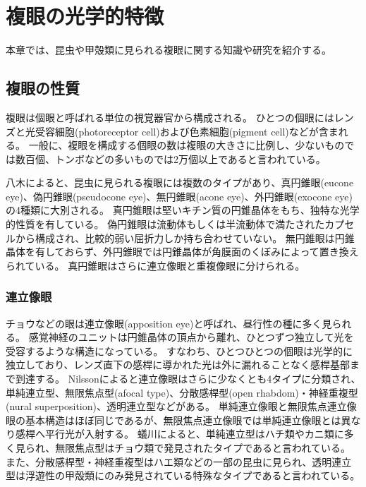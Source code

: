 \chapter{複眼の光学的特徴}
\label{CKnowledge}

本章では、昆虫や甲殻類に見られる複眼に関する知識や研究を紹介する。

\section{複眼の性質}

複眼は個眼と呼ばれる単位の視覚器官から構成される。
ひとつの個眼にはレンズと光受容細胞(photoreceptor cell)および色素細胞(pigment cell)などが含まれる。
一般に、複眼を構成する個眼の数は複眼の大きさに比例し、少ないものでは数百個、トンボなどの多いものでは2万個以上であると言われている。

八木\cite{}によると、昆虫に見られる複眼には複数のタイプがあり、真円錐眼(eucone eye)、偽円錐眼(pseudocone eye)、無円錐眼(acone eye)、外円錐眼(exocone eye)の4種類に大別される。
真円錐眼は堅いキチン質の円錐晶体をもち、独特な光学的性質を有している。
偽円錐眼は流動体もしくは半流動体で満たされたカプセルから構成され、比較的弱い屈折力しか持ち合わせていない。
無円錐眼は円錐晶体を有しておらず、外円錐眼では円錐晶体が角膜面のくぼみによって置き換えられている。
真円錐眼はさらに連立像眼と重複像眼に分けられる。

\subsection{連立像眼}

チョウなどの眼は連立像眼(apposition eye)と呼ばれ、昼行性の種に多く見られる。
感覚神経のユニットは円錐晶体の頂点から離れ、ひとつずつ独立して光を受容するような構造になっている\cite{}。
すなわち、ひとつひとつの個眼は光学的に独立しており、レンズ直下の感桿に導かれた光は外に漏れることなく感桿基部まで到達する\cite{}。
Nilsson\cite{}によると連立像眼はさらに少なくとも4タイプに分類され、単純連立型、無限焦点型(afocal type)、分散感桿型(open rhabdom)・神経重複型(nural superposition)、透明連立型などがある。
単純連立像眼と無限焦点連立像眼の基本構造はほぼ同じであるが、無限焦点連立像眼では単純連立像眼とは異なり感桿へ平行光が入射する。
蟻川\cite{}によると、単純連立型はハチ類やカニ類に多く見られ、無限焦点型はチョウ類で発見されたタイプであると言われている。
また、分散感桿型・神経重複型はハエ類などの一部の昆虫に見られ、透明連立型は浮遊性の甲殻類にのみ発見されている特殊なタイプであると言われている。

